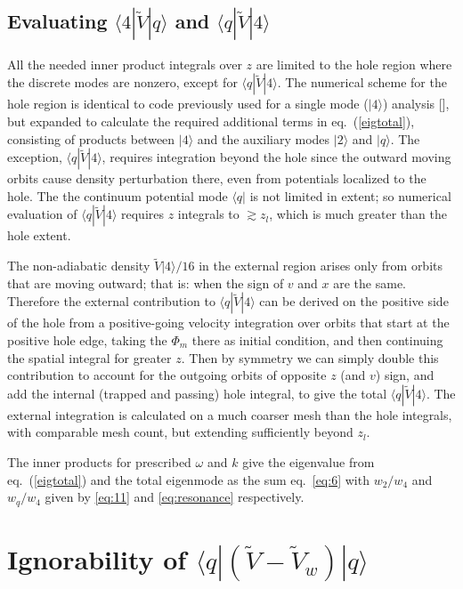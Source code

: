 \documentclass[12pt]{article}
\def\ket#1{|#1\rangle}
\def\bra#1{\langle#1}
\begin{document}
\subsection{Evaluating $\bra{4}|\tilde{V}\ket{q}$ and $\bra{q}|\tilde{V}\ket{4}$}

All the needed inner product integrals over $z$ are limited to the
hole region where the discrete modes are nonzero, except for
$\bra{q}|\tilde V\ket{4}$.  The numerical scheme for the hole region
is identical to code previously used for a single mode ($\ket{4}$)
analysis [], but expanded to calculate the required additional terms
in eq.\ (\ref{eigtotal}), consisting of products between $\ket{4}$
and the auxiliary modes $\ket{2}$ and $\ket{q}$.  The exception,
$\bra{q}|\tilde V\ket{4}$, requires integration beyond the hole since
the outward moving orbits cause density perturbation there, even from
potentials localized to the hole. The the continuum potential mode
$\bra{q}|$ is not limited in extent; so numerical evaluation of
$\bra{q}|\tilde V\ket{4}$ requires $z$ integrals to $\gtrsim z_l$,
which is much greater than the hole extent.


The non-adiabatic density $\tilde V \ket{4}/16$ in the external region
arises only from orbits that are moving outward; that is: when the
sign of $v$ and $x$ are the same. Therefore the external contribution
to $\bra{q}|\tilde V \ket{4}$ can be derived on the positive side of
the hole from a positive-going velocity integration over orbits that
start at the positive hole edge, taking the $\Phi_m$ there as initial
condition, and then continuing the spatial integral for greater $z$.
Then by symmetry we can simply double this contribution to account for
the outgoing orbits of opposite $z$ (and $v$) sign, and add the
internal (trapped and passing) hole integral, to give the total
$\bra{q}|\tilde V \ket{4}$.  The external integration is calculated on
a much coarser mesh than the hole integrals, with comparable mesh
count, but extending sufficiently beyond $z_l$.

The inner products for prescribed $\omega$ and $k$ give the eigenvalue
from eq.\ (\ref{eigtotal}) and the total eigenmode as the sum eq.\
\ref{eq:6} with $w_2/w_4$ and $w_q/w_4$ given by \ref{eq:11} and
\ref{eq:resonance} respectively. 



\appendix
\section{Ignorability of $\bra{q}|(\tilde{V}-\tilde{V}_{w})\ket{q}$}
\label{ignorability}
\end{document}
